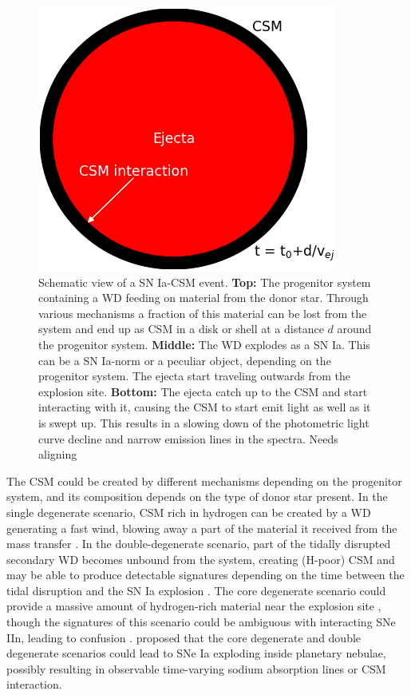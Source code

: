 \documentclass[a4paper,oneside,12pt, class=Latex/Classes/PhDthesisPSnPDF, crop=false]{standalone}
\begin{document}
\begin{figure}
    \includegraphics[height=0.281\textheight]{../Images/chapter_1/CSM_sketch_3.png}
    \caption{Schematic view of a SN Ia-CSM event. \textbf{Top:} The progenitor system containing a WD feeding on material from the donor star. Through various mechanisms a fraction of this material can be lost from the system and end up as CSM in a disk or shell at a distance $d$ around the progenitor system. \textbf{Middle:} The WD explodes as a SN Ia. This can be a SN Ia-norm or a peculiar object, depending on the progenitor system. The ejecta start traveling outwards from the explosion site. \textbf{Bottom:} The ejecta catch up to the CSM and start interacting with it, causing the CSM to start emit light as well as it is swept up. This results in a slowing down of the photometric light curve decline and narrow emission lines in the spectra. \color{red} Needs aligning \color{black}}
    \label{Ia-CSM_mod}
\end{figure}

The CSM could be created by different mechanisms depending on the progenitor system, and its composition depends on the type of donor star present. In the single degenerate scenario, CSM rich in hydrogen can be created by a WD generating a fast wind, blowing away a part of the material it received from the mass transfer \citep{single_degen_CSM_gen}. In the double-degenerate scenario, part of the tidally disrupted secondary WD becomes unbound from the system, creating (H-poor) CSM and may be able to produce detectable signatures depending on the time between the tidal disruption and the SN Ia explosion \citep{Double_degen_CSM_gen}. The core degenerate scenario could provide a massive amount of hydrogen-rich material near the explosion site \citep[e.g. for SN 2014J,][]{2014J_core_deg}, though the signatures of this scenario could be ambiguous with interacting SNe IIn, leading to confusion \citep{2012ca_Ia-CSM/IIn}. \citet{snips} proposed that the core degenerate and double degenerate scenarios could lead to SNe Ia exploding inside planetary nebulae, possibly resulting in observable time-varying sodium absorption lines or CSM interaction.
\end{document}
